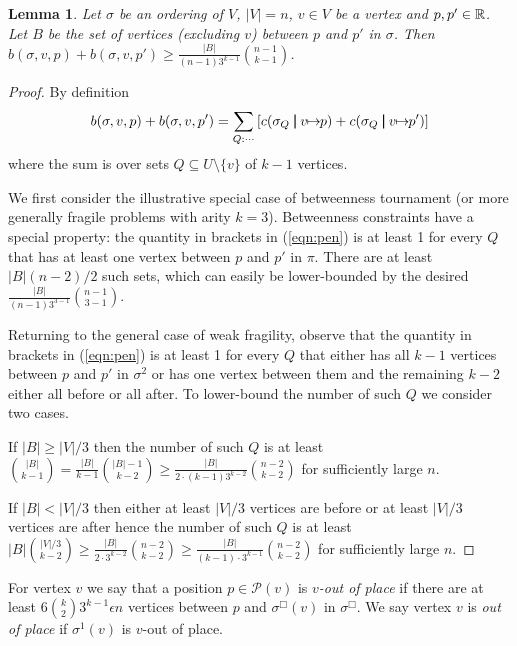 \documentclass[dvips,11pt,letter]{article}
\newcommand{\set}[1]{\{#1\}}                        \newcommand{\setof}[2]{\{\,{#1}\::\:{#2}\,\}}        \newcommand{\groupFrac}[2]{\left(\frac{#1}{#2}\right)}
\newcommand{\sm}{\setminus} \newcommand{\compl}[1]{\overline{#1}}                \newcommand{\floor}[1]{\left\lfloor #1 \right\rfloor}
\newtheorem{lemma}[theorem]{Lemma}
\newcommand{\unaryOrdering}{\!\!\mapsto\!\!}
\newcommand{\posns}{\mathcal{P}}
\newcommand{\bp}{\,\,\rule[-0.22em]{0.08em}{1em}\,\,} \newcommand{\restrictO}[2]{{#1}_{#2}}
\newcommand{\roundOpt}{\sigma^{\Box}}
\begin{document}
\begin{lemma}\label{lem:fragile} Let $\sigma$ be an ordering of $V$, $|V|=n$, $v\in V$ be a vertex and $p,p' \in \mathbb{R}$.
Let $B$ be the set of vertices (excluding $v$) between $p$ and $p'$ in $\sigma$. 
Then
$b(\sigma, v, p) + b(\sigma, v, p') \ge \frac{|B|}{(n-1)3^{k-1}}\binom{n-1}{k-1}$. 
\end{lemma}

\begin{proof}By definition
\begin{equation}
b(\sigma, v, p) + b(\sigma, v, p') = \sum_{Q : \cdots} \left[ c(\restrictO{\sigma}{Q} \bp v \unaryOrdering p)+c(\restrictO{\sigma}{Q} \bp v \unaryOrdering p') \right] \label{eqn:pen}
\end{equation}
where the sum is over sets $Q \subseteq U \sm \set{v}$ of $k-1$ vertices.

We first consider the illustrative special case of betweenness tournament (or more generally fragile problems with arity $k=3$). Betweenness constraints have a special property: the quantity in brackets in (\ref{eqn:pen}) is at least 1 for every $Q$ that has at least one vertex between $p$ and $p'$ in $\pi$. There are at least $|B| (n-2)/2$ such sets, which can easily be lower-bounded by the desired $\frac{|B|}{(n-1)3^{3-1}}\binom{n-1}{3-1}$.

Returning to the general case of weak fragility, observe that the quantity in brackets in (\ref{eqn:pen}) is at least 1 for every $Q$ that either has all $k-1$ vertices between $p$ and $p'$ in $\sigma^2$ or has one vertex between them and the remaining $k-2$ either all before or all after. To lower-bound the number of such $Q$ we consider two cases.

If $|B| \ge |V|/3$ then the number of such $Q$ is at least $\binom{|B|}{k-1} = \frac{|B|}{k-1}\binom{|B|-1}{k-2} \geq \frac{|B|}{2 \cdot (k-1)3^{k-2}}\binom{n-2}{k-2}$ for sufficiently large $n$.

If $|B| < |V|/3$ then either at least $|V|/3$ vertices are before or at least $|V|/3$ vertices are after hence the number of such $Q$ is at least 
$|B|\binom{|V|/3}{k-2} \ge \frac{|B|}{2 \cdot 3^{k-2}}\binom{n-2}{k-2} \ge \frac{|B|}{(k-1) \cdot 3^{k-1}}\binom{n-2}{k-2}$ for sufficiently large $n$.
\end{proof}


For vertex $v$ we say that a position $p \in \posns(v) $ is  \emph{$v$-out of place} if there are at least $6 \binom{k}{2} 3^{k-1} \epsilon n$ vertices between $p$ and $\roundOpt(v)$ in $\roundOpt$. We say vertex $v$ is \emph{out of place} if $\sigma^1(v)$ is $v$-out of place.
\end{document}
